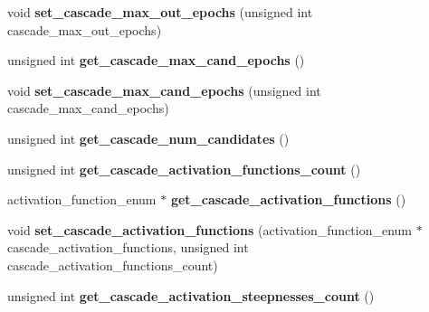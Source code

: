 \begin{DoxyCompactItemize}
\item 
\hypertarget{class_f_a_n_n_1_1neural__net_a9bdb9b81ba4749fe7a38aa059473b4a7}{void {\bfseries set\-\_\-cascade\-\_\-max\-\_\-out\-\_\-epochs} (unsigned int cascade\-\_\-max\-\_\-out\-\_\-epochs)}\label{class_f_a_n_n_1_1neural__net_a9bdb9b81ba4749fe7a38aa059473b4a7}

\item 
\hypertarget{class_f_a_n_n_1_1neural__net_a3fb9ae30ecd2269f0e4d73c550072681}{unsigned int {\bfseries get\-\_\-cascade\-\_\-max\-\_\-cand\-\_\-epochs} ()}\label{class_f_a_n_n_1_1neural__net_a3fb9ae30ecd2269f0e4d73c550072681}

\item 
\hypertarget{class_f_a_n_n_1_1neural__net_ab8af0846bc41ea2ff0d5e60ba9f89c18}{void {\bfseries set\-\_\-cascade\-\_\-max\-\_\-cand\-\_\-epochs} (unsigned int cascade\-\_\-max\-\_\-cand\-\_\-epochs)}\label{class_f_a_n_n_1_1neural__net_ab8af0846bc41ea2ff0d5e60ba9f89c18}

\item 
\hypertarget{class_f_a_n_n_1_1neural__net_ac86d7b703486f7d4e818bcae0f447f9d}{unsigned int {\bfseries get\-\_\-cascade\-\_\-num\-\_\-candidates} ()}\label{class_f_a_n_n_1_1neural__net_ac86d7b703486f7d4e818bcae0f447f9d}

\item 
\hypertarget{class_f_a_n_n_1_1neural__net_abf328d3786fff1a01568a78a6d262d07}{unsigned int {\bfseries get\-\_\-cascade\-\_\-activation\-\_\-functions\-\_\-count} ()}\label{class_f_a_n_n_1_1neural__net_abf328d3786fff1a01568a78a6d262d07}

\item 
\hypertarget{class_f_a_n_n_1_1neural__net_a610b249274785bb10ad240a0befbe3ae}{activation\-\_\-function\-\_\-enum $\ast$ {\bfseries get\-\_\-cascade\-\_\-activation\-\_\-functions} ()}\label{class_f_a_n_n_1_1neural__net_a610b249274785bb10ad240a0befbe3ae}

\item 
\hypertarget{class_f_a_n_n_1_1neural__net_a8b860dbed58a2d6c1e486d53014849ab}{void {\bfseries set\-\_\-cascade\-\_\-activation\-\_\-functions} (activation\-\_\-function\-\_\-enum $\ast$cascade\-\_\-activation\-\_\-functions, unsigned int cascade\-\_\-activation\-\_\-functions\-\_\-count)}\label{class_f_a_n_n_1_1neural__net_a8b860dbed58a2d6c1e486d53014849ab}

\item 
\hypertarget{class_f_a_n_n_1_1neural__net_a7fe58e62a0b4a5727bb2d01020befc22}{unsigned int {\bfseries get\-\_\-cascade\-\_\-activation\-\_\-steepnesses\-\_\-count} ()}\label{class_f_a_n_n_1_1neural__net_a7fe58e62a0b4a5727bb2d01020befc22}


\end{DoxyCompactItemize}
